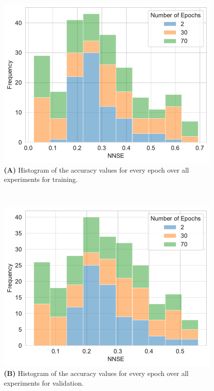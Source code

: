 \documentclass[utf8]{FrontiersinVancouver} %
\begin{document}
\begin{figure}[p]

  \begin{center}
       \begin{minipage}[t]{0.49\textwidth}
        \includegraphics[width=1.0\linewidth]{images/frequency_nnse_histogram_stacked_training}
        {\bf (A)} Histogram of the accuracy values for every epoch over all experiments for training.
     \end{minipage}
  \ \
     \begin{minipage}[t]{0.49\textwidth}
        \includegraphics[width=1.0\linewidth]{images/frequency_nnse_histogram_stacked_validation}
        {\bf (B)} Histogram of the accuracy values for every epoch over all experiments for validation.

\end{minipage}
\end{center}
\end{figure}
\end{document}
